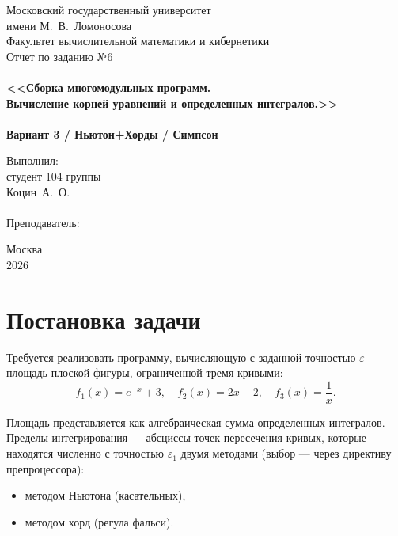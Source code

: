\documentclass[a4paper,12pt,titlepage,finall]{article}
\begin{document}
\begin{titlepage}
    \begin{center}
        {\small \sc Московский государственный университет \\
        имени М.~В.~Ломоносова \\
        Факультет вычислительной математики и кибернетики\\}
        \vfill
        {\Large \sc Отчет по заданию №6}\\
        ~\\
        {\large \bf <<Сборка многомодульных программ. \\
        Вычисление корней уравнений и определенных интегралов.>>}\\
        ~\\
        {\large \bf Вариант 3 / Ньютон+Хорды / Симпсон}
    \end{center}
    \begin{flushright}
        \vfill {Выполнил:\\
        студент 104 группы\\
        Коцин~А.~О.\\
        ~\\
        Преподаватель:\\
        }
    \end{flushright}
    \begin{center}
        \vfill
        {\small Москва\\2026}
    \end{center}
\end{titlepage}

\tableofcontents
\newpage

\section{Постановка задачи}

Требуется реализовать программу, вычисляющую с заданной точностью $\varepsilon$
площадь плоской фигуры, ограниченной тремя кривыми:
\[
    f_1(x) = e^{-x} + 3, \quad f_2(x) = 2x - 2, \quad f_3(x) = \frac{1}{x}.
\]

Площадь представляется как алгебраическая сумма определенных интегралов.
Пределы интегрирования --- абсциссы точек пересечения кривых, которые
находятся численно с точностью $\varepsilon_1$ двумя методами (выбор ---
через директиву препроцессора):
\begin{itemize}
    \item методом Ньютона (касательных),
    \item методом хорд (регула фальси).
\end{itemize}
\end{document}
